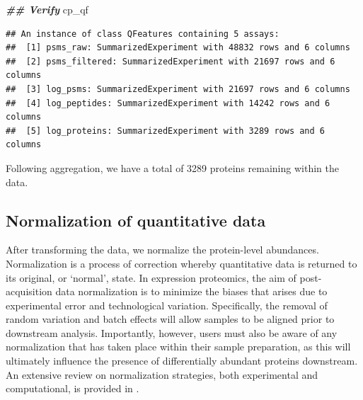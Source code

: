 \documentclass[9pt,a4paper,]{extarticle}
\newenvironment{Shaded}{\begin{snugshade}}{\end{snugshade}}
\newcommand{\DocumentationTok}[1]{\textcolor[rgb]{0.56,0.35,0.01}{\textbf{\textit{#1}}}}
\newcommand{\NormalTok}[1]{#1}
\begin{document}
\begin{Shaded}
\begin{Highlighting}[]
\DocumentationTok{\#\# Verify}
\NormalTok{cp\_qf}
\end{Highlighting}
\end{Shaded}

\begin{verbatim}
## An instance of class QFeatures containing 5 assays:
##  [1] psms_raw: SummarizedExperiment with 48832 rows and 6 columns 
##  [2] psms_filtered: SummarizedExperiment with 21697 rows and 6 columns 
##  [3] log_psms: SummarizedExperiment with 21697 rows and 6 columns 
##  [4] log_peptides: SummarizedExperiment with 14242 rows and 6 columns 
##  [5] log_proteins: SummarizedExperiment with 3289 rows and 6 columns
\end{verbatim}

Following aggregation, we have a total of 3289
proteins remaining within the data.

\hypertarget{normalization-of-quantitative-data}{%
\subsection{Normalization of quantitative data}\label{normalization-of-quantitative-data}}

After transforming the data, we normalize the protein-level abundances.
Normalization is a process of correction whereby quantitative data is returned
to its original, or `normal', state. In expression proteomics, the aim of post-
acquisition data normalization is to minimize the biases that arises due to
experimental error and technological variation. Specifically, the removal of
random variation and batch effects will allow samples to be aligned prior to
downstream analysis. Importantly, however, users must also be aware of any
normalization that has taken place within their sample preparation, as this will
ultimately influence the presence of differentially abundant proteins
downstream. An extensive review on normalization strategies, both experimental
and computational, is provided in \citep{ORourke2019}.
\end{document}
